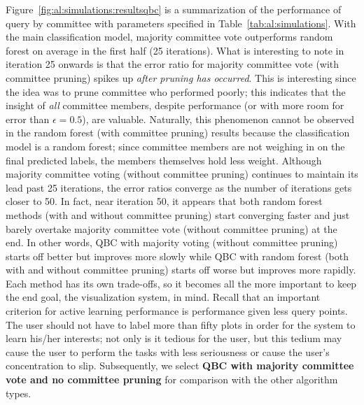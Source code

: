 Figure~\ref{fig:al:simulations:resultsqbc} is a summarization of the 
performance of query by committee with parameters specified in 
Table~\ref{tab:al:simulations}. With the main classification model, majority 
committee vote outperforms random forest on 
average in the first half (25 iterations). What is interesting to note in 
iteration 25 onwards is that the error ratio for majority committee vote (with 
committee pruning) spikes up \textit{after pruning has occurred}. 
This is interesting since the idea was to prune committee who performed poorly; 
this indicates that the insight of \textit{all} committee members, 
despite performance (or with more room for error than $\epsilon = 0.5$), are 
valuable. 
Naturally, this phenomenon cannot be observed in the random forest (with 
committee pruning) results because the classification model is a random forest; 
since committee members are not weighing in on the final predicted labels, the 
members themselves hold less weight. Although majority committee voting 
(without committee pruning)
continues to maintain its lead past 25 iterations, the error ratios converge as 
the number of iterations gets closer to 50. In fact, near iteration 50, it 
appears that both random forest methods (with and without committee pruning) 
start converging faster and just barely overtake majority committee vote 
(without committee pruning) at the end. In other words, QBC with majority 
voting (without committee pruning) starts off better but improves more slowly 
while QBC with random forest (both with and without committee pruning)
starts off worse but improves more rapidly.
Each method has its own trade-offs, so it becomes all the more important to 
keep the end goal, the visualization system, in mind. Recall that an important 
criterion for active learning performance is performance given {less query
points}. The user should not have to label more than fifty plots in order for 
the system to learn his/her interests; not only is it tedious for the user, but 
this tedium may cause the user to perform the tasks with less seriousness or 
cause the user's concentration to slip. Subsequently, we select \textbf{QBC 
with majority committee vote and no committee pruning} for comparison with the 
other algorithm types.

